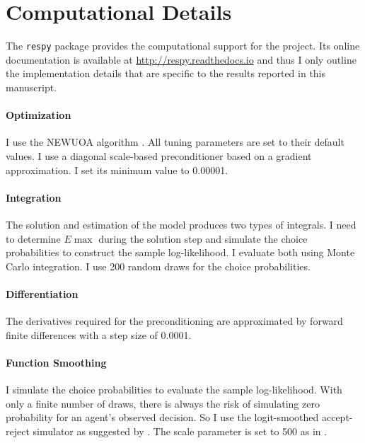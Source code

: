 \section{Computational Details}\label{Computational Details}
The \verb+respy+ package \citep{respy-1.0} provides the computational support for the project. Its online documentation is available at \url{http://respy.readthedocs.io} and thus I only outline the implementation details that are specific to the results reported in this manuscript.

\paragraph{Optimization} I use the NEWUOA algorithm \citep{Powell.2006}. All tuning parameters are set to their default values. I use a diagonal scale-based preconditioner based on a gradient approximation. I set its minimum value to 0.00001.

\paragraph{Integration} The solution and estimation of the model produces two types of integrals. I need to determine $E\max$ during the solution step and simulate the choice probabilities to construct the sample log-likelihood. I evaluate both using Monte Carlo integration. I use 200 random draws for the choice probabilities.

\paragraph{Differentiation} The derivatives required for the preconditioning are approximated by forward finite differences with a step size of 0.0001.

\paragraph{Function Smoothing} I simulate the choice probabilities to evaluate the sample log-likelihood. With only a finite number of draws, there is always the risk of simulating zero probability for an agent's observed decision. So I use the logit-smoothed accept-reject simulator as suggested by \citet{McFadden.1989}. The scale parameter is set to 500 as in \citet{Keane.1994}.


